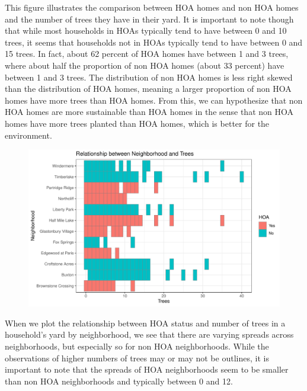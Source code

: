 \documentclass{article}
\begin{document}
This figure illustrates the comparison between HOA homes and non HOA homes and the number of trees they have in their yard. It is important to note though that while most households in HOAs typically tend to have between 0 and 10 trees, it seems that households not in HOAs typically tend to have between 0 and 15 trees. In fact, about 62 percent of HOA homes have between 1 and 3 trees, where about half the proportion of non HOA homes (about 33 percent) have between 1 and 3 trees. The distribution of non HOA homes is less right skewed than the distribution of HOA homes, meaning a larger proportion of non HOA homes have more trees than HOA homes. From this, we can hypothesize that non HOA homes are more sustainable than HOA homes in the sense that non HOA homes have more trees planted than HOA homes, which is better for the environment.
\begin{figure}[H]
		\centering
\includegraphics{exam23-021}
		\label{Fig:plot7}
	\end{figure}
When we plot the relationship between HOA status and number of trees in a household's yard by neighborhood, we see that there are varying spreads across neighborhoods, but especially so for non HOA neighborhoods. While the observations of higher numbers of trees may or may not be outlines, it is important to note that the spreads of HOA neighborhoods seem to be smaller than non HOA neighborhoods and typically between 0 and 12. 
\end{document}
